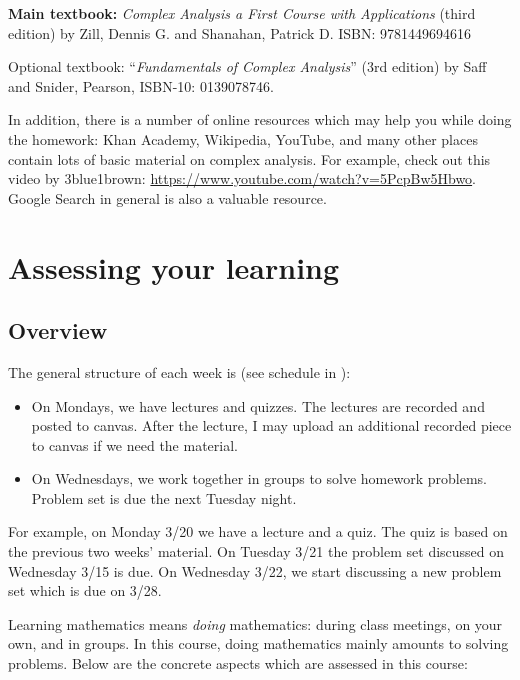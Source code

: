 \documentclass[oneside,11pt]{amsart}
\begin{document}
\textbf{Main textbook:}
\emph{Complex Analysis a First Course with Applications} (third edition)
by
Zill, Dennis G. and Shanahan, Patrick D. 
ISBN: 9781449694616

\medskip


Optional textbook: “\emph{Fundamentals of Complex Analysis}” (3rd edition)
by Saff and Snider, Pearson, ISBN-10: 0139078746.

\medskip

In addition, there is a number of online resources which may help you while doing the homework:
Khan Academy, Wikipedia, YouTube, and many other 
places contain lots of basic material on complex analysis. 
For example, check out this video by 3blue1brown: \url{https://www.youtube.com/watch?v=5PcpBw5Hbwo}.
Google Search
in general
is also a valuable resource.

\section{Assessing your learning}

\subsection*{Overview}

The general structure of each week is (see schedule in ):
\begin{itemize}
	\item On Mondays, we have lectures and quizzes. 
	The lectures are recorded and posted to canvas. After the lecture, I may upload an 
	additional recorded piece to canvas if we need the material.
	\item On Wednesdays, we work together in groups to solve homework problems. Problem set is due the next Tuesday night.
\end{itemize}
For example, on Monday 3/20 we have a lecture and a quiz. The quiz is based on the previous two weeks' material. 
On Tuesday 3/21 the problem set discussed on Wednesday 3/15 is due.
On Wednesday 3/22, we start discussing a new problem set which is due on 3/28.

\medskip

Learning mathematics means \emph{doing} mathematics: during class meetings, on your own, and in groups. 
In this course, doing mathematics mainly amounts to solving problems.
Below are the concrete aspects which are assessed in this course:
\end{document}

